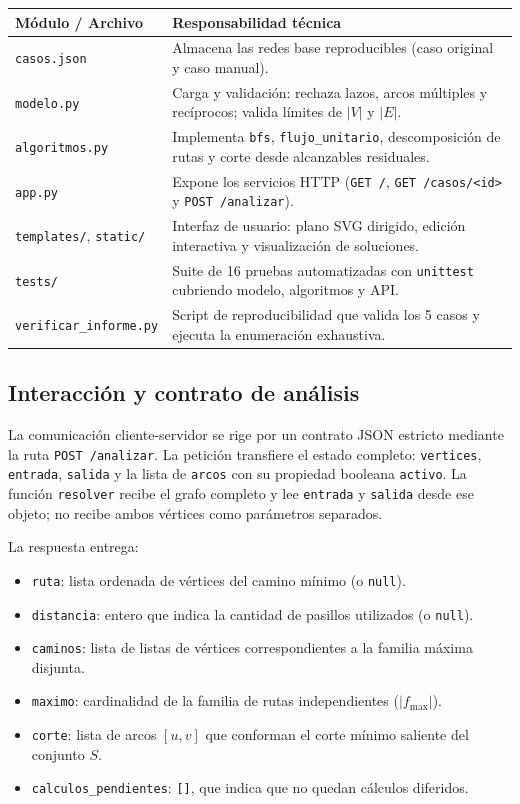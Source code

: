 \documentclass[11pt,a4paper]{article}
\begin{document}
\begin{center}
{\small
\begin{tabularx}{\linewidth}{@{}p{.26\linewidth}X@{}}
\toprule
\textbf{Módulo / Archivo} & \textbf{Responsabilidad técnica} \\
\midrule
\texttt{casos.json} & Almacena las redes base reproducibles (caso original y caso manual). \\
\texttt{modelo.py} & Carga y validación: rechaza lazos, arcos múltiples y recíprocos; valida límites de $|V|$ y $|E|$. \\
\texttt{algoritmos.py} & Implementa \texttt{bfs}, \texttt{flujo\_unitario}, descomposición de rutas y corte desde alcanzables residuales. \\
\texttt{app.py} & Expone los servicios HTTP (\texttt{GET /}, \texttt{GET /casos/<id>} y \texttt{POST /analizar}). \\
\texttt{templates/}, \texttt{static/} & Interfaz de usuario: plano SVG dirigido, edición interactiva y visualización de soluciones. \\
\texttt{tests/} & Suite de 16 pruebas automatizadas con \texttt{unittest} cubriendo modelo, algoritmos y API. \\
\texttt{verificar\_informe.py} & Script de reproducibilidad que valida los 5 casos y ejecuta la enumeración exhaustiva. \\
\bottomrule
\end{tabularx}}
\end{center}

\subsection{Interacción y contrato de análisis}
La comunicación cliente-servidor se rige por un contrato JSON estricto mediante la ruta \texttt{POST /analizar}. La petición transfiere el estado completo: \texttt{vertices}, \texttt{entrada}, \texttt{salida} y la lista de \texttt{arcos} con su propiedad booleana \texttt{activo}. La función \texttt{resolver} recibe el grafo completo y lee \texttt{entrada} y \texttt{salida} desde ese objeto; no recibe ambos vértices como parámetros separados.

La respuesta entrega:
\begin{itemize}[noitemsep]
  \item \texttt{ruta}: lista ordenada de vértices del camino mínimo (o \texttt{null}).
  \item \texttt{distancia}: entero que indica la cantidad de pasillos utilizados (o \texttt{null}).
  \item \texttt{caminos}: lista de listas de vértices correspondientes a la familia máxima disjunta.
  \item \texttt{maximo}: cardinalidad de la familia de rutas independientes ($|f_{\max}|$).
  \item \texttt{corte}: lista de arcos $[u, v]$ que conforman el corte mínimo saliente del conjunto $S$.
  \item \texttt{calculos\_pendientes}: \texttt{[]}, que indica que no quedan cálculos diferidos.
\end{itemize}
\end{document}
